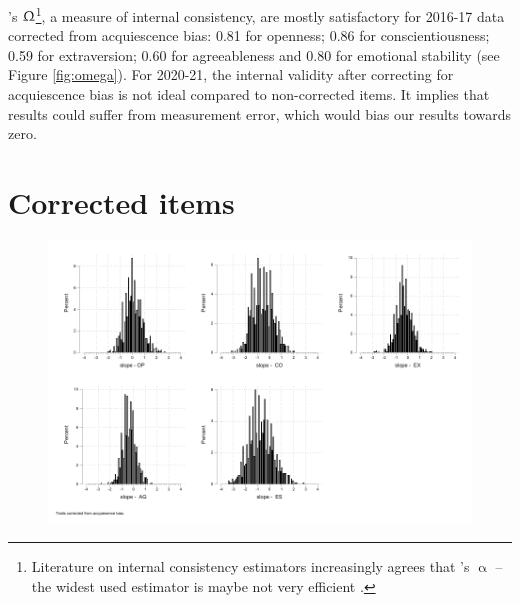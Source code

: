 \documentclass[a4paper, 12pt, onecolumn]{article}
\begin{document}
\citeauthor{McDonald1999}'s $\Upomega$\footnote{Literature on internal consistency estimators increasingly agrees that \citeauthor{Cronbach1951}'s $\upalpha$ --the widest used estimator is maybe not very efficient \citep{Bourque2019, TrizanoHermosilla2016}.}, a measure of internal consistency, are mostly satisfactory for 2016-17 data corrected from acquiescence bias: 0.81 for openness; 0.86 for conscientiousness; 0.59 for extraversion; 0.60 for agreeableness and 0.80 for emotional stability (see Figure \ref{fig:omega}).
For 2020-21, the internal validity after correcting for acquiescence bias is not ideal compared to non-corrected items.
It implies that results could suffer from measurement error, which would bias our results towards zero.




\clearpage
\newpage
\section{Corrected items}

\begin{figure}[!h]
\raggedright
\includegraphics[scale=0.8]{INPUT/diffcont_cor}
\caption{}
\label{fig:diffagecor}
\end{figure}
\end{document}

